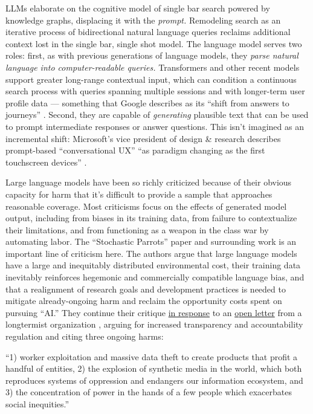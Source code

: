 \documentclass{article}
\renewenvironment{leftbar}
{\vspace{6pt}\def\FrameCommand{\hspace{0em}\vrule width 0.5pt \hspace{1em}}\MakeFramed {\advance\hsize-\width \FrameRestore}}
{\endMakeFramed}
\begin{document}
LLMs elaborate on the cognitive model of single bar search powered by
knowledge graphs, displacing it with the \emph{prompt.} Remodeling
search as an iterative process of bidirectional natural language queries
reclaims additional context lost in the single bar, single shot model.
The language model serves two roles: first, as with previous generations
of language models, they \emph{parse natural language into
computer-readable queries.} Transformers and other recent models support
greater long-range contextual input, which can condition a continuous
search process with queries spanning multiple sessions \cite{maChallengesSupportingExploratory2020a}  and with longer-term user
profile data --- something that Google describes as its ``shift from
answers to journeys'' \cite{gomesImprovingSearchNext2018, konzelmannChattingYourGoogle2018} . Second, they are capable of
\emph{generating} plausible text that can be used to prompt intermediate
responses or answer questions. This isn't imagined as an incremental
shift: Microsoft's vice president of design \& research describes
prompt-based ``conversational UX'' ``as paradigm changing as the first
touchscreen devices'' \cite{friedmanBehindtheDesignMeetCopilot2023} .

Large language models have been so richly criticized because of their
obvious capacity for harm that it's difficult to provide a sample that
approaches reasonable coverage. Most criticisms focus on the effects of
generated model output, including from biases in its training data, from
failure to contextualize their limitations, and from functioning as a
weapon in the class war by automating labor. The ``Stochastic Parrots''
paper \cite{benderDangersStochasticParrots2021}  and surrounding
work is an important line of criticism here. The authors argue that
large language models have a large and inequitably distributed
environmental cost, their training data inevitably reinforces hegemonic
and commercially compatible language bias, and that a realignment of
research goals and development practices is needed to mitigate
already-ongoing harm and reclaim the opportunity costs spent on pursuing
``AI.'' They continue their critique
\href{https://www.dair-institute.org/blog/letter-statement-March2023}{in
response} to an
\href{https://futureoflife.org/open-letter/pause-giant-ai-experiments/}{open
letter} from a longtermist organization \cite{futureoflifeinstitutePauseGiantAI2023} , arguing for increased
transparency and accountability regulation and citing three ongoing
harms:

\begin{leftbar}
``1) worker exploitation and massive data theft to create products that
profit a handful of entities, 2) the explosion of synthetic media in the
world, which both reproduces systems of oppression and endangers our
information ecosystem, and 3) the concentration of power in the hands of
a few people which exacerbates social inequities.'' \cite{gebruStatementListedAuthors2023} 
\end{leftbar}
\end{document}
